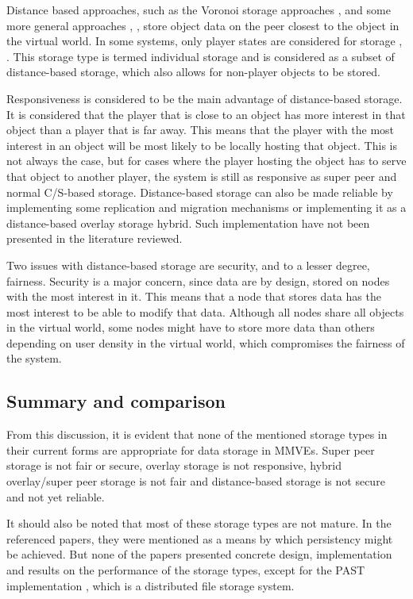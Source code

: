 \documentclass[10pt,a4paper,conference]{IEEEtran}
\begin{document}
Distance based approaches, such as the Voronoi storage approaches \cite{Buyukkaya_voronoi_state_management}, \cite{Hu_voronoi_IM} and some more
general approaches \cite{colyseus_distance_based}, \cite{solipsis}, store object data on the peer closest to the object in the virtual world. In some
systems, only player states are considered for storage \cite{individual_storage1}, \cite{cheat_proof_playout}. This storage type is termed individual
storage and is considered as a subset of distance-based storage, which also allows for non-player objects to be stored.

Responsiveness is considered to be the main advantage of distance-based storage. It is considered that the player that is close to an object has more
interest in that object than a player that is far away. This means that the player with the most interest in an object will be most likely to be
locally hosting that object. This is not always the case, but for cases where the player hosting the object has to serve that object to another
player, the system is still as responsive as super peer and normal C/S-based storage. Distance-based storage can also be made reliable by
implementing some replication and migration mechanisms or implementing it as a distance-based overlay storage hybrid. Such implementation have not
been presented in the literature reviewed.

Two issues with distance-based storage are security, and to a lesser degree, fairness. Security is a major concern, since data are by design, stored
on nodes with the most interest in it. This means that a node that stores data has the most interest to be able to modify that data. Although all
nodes share all objects in the virtual world, some nodes might have to store more data than others depending on user density in the virtual world,
which compromises the fairness of the system.

\subsection{Summary and comparison}

From this discussion, it is evident that none of the mentioned storage types in their current forms are appropriate for data storage in MMVEs. Super
peer storage is not fair or secure, overlay storage is not responsive, hybrid overlay/super peer storage is not fair and distance-based storage is
not secure and not yet reliable.

It should also be noted that most of these storage types are not mature. In the referenced papers, they were mentioned as a means by which
persistency might be achieved. But none of the papers presented concrete design, implementation and results on the performance of the storage types,
except for the PAST implementation \cite{PAST_storage}, which is a distributed file storage system.
\end{document}
